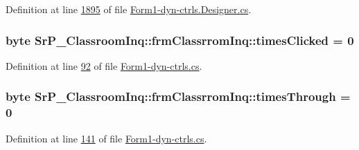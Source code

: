 \-Definition at line \hyperlink{_form1-dyn-ctrls_8_designer_8cs_source_l01895}{1895} of file \hyperlink{_form1-dyn-ctrls_8_designer_8cs_source}{\-Form1-\/dyn-\/ctrls.\-Designer.\-cs}.

\hypertarget{class_sr_p___classroom_inq_1_1frm_classrrom_inq_a8b01f872cc35c75e41502f5114a65b74}{
\subsubsection[{times\-Clicked}]{\setlength{\rightskip}{0pt plus 5cm}byte {\bf \-Sr\-P\-\_\-\-Classroom\-Inq\-::frm\-Classrrom\-Inq\-::times\-Clicked} = 0}}
\label{class_sr_p___classroom_inq_1_1frm_classrrom_inq_a8b01f872cc35c75e41502f5114a65b74}


\-Definition at line \hyperlink{_form1-dyn-ctrls_8cs_source_l00092}{92} of file \hyperlink{_form1-dyn-ctrls_8cs_source}{\-Form1-\/dyn-\/ctrls.\-cs}.

\hypertarget{class_sr_p___classroom_inq_1_1frm_classrrom_inq_ab730336bf81938256d6f20922c15484b}{
\subsubsection[{times\-Through}]{\setlength{\rightskip}{0pt plus 5cm}byte {\bf \-Sr\-P\-\_\-\-Classroom\-Inq\-::frm\-Classrrom\-Inq\-::times\-Through} = 0}}
\label{class_sr_p___classroom_inq_1_1frm_classrrom_inq_ab730336bf81938256d6f20922c15484b}


\-Definition at line \hyperlink{_form1-dyn-ctrls_8cs_source_l00141}{141} of file \hyperlink{_form1-dyn-ctrls_8cs_source}{\-Form1-\/dyn-\/ctrls.\-cs}.

